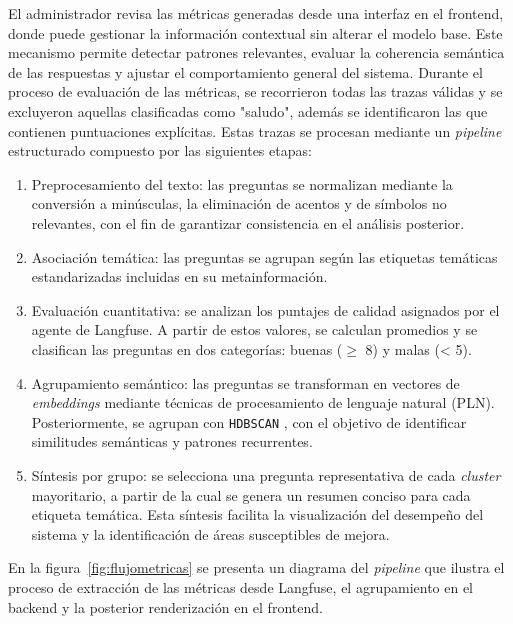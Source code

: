 El administrador revisa las métricas generadas desde una interfaz en el frontend, donde puede gestionar la información contextual sin alterar el modelo base. Este mecanismo permite detectar patrones relevantes, evaluar la coherencia semántica de las respuestas y ajustar el comportamiento general del sistema.
Durante el proceso de evaluación de las métricas, se recorrieron todas las trazas válidas y se excluyeron aquellas clasificadas como "saludo", además se identificaron las que contienen puntuaciones explícitas. Estas trazas se procesan mediante un \textit{pipeline} estructurado compuesto por las siguientes etapas:

\begin{enumerate}
    \item Preprocesamiento del texto: las preguntas se normalizan mediante la conversión a minúsculas, la eliminación de acentos y de símbolos no relevantes, con el fin de garantizar consistencia en el análisis posterior.

    \item Asociación temática: las preguntas se agrupan según las etiquetas temáticas estandarizadas incluidas en su metainformación.

    \item Evaluación cuantitativa: se analizan los puntajes de calidad asignados por el agente de Langfuse. A partir de estos valores, se calculan promedios y se clasifican las preguntas en dos categorías: buenas (\(\geq\) 8) y malas (< 5).

    \item Agrupamiento semántico: las preguntas se transforman en vectores de \emph{embeddings} mediante técnicas de procesamiento de lenguaje natural (PLN). Posteriormente, se agrupan con \texttt{HDBSCAN} \citep{HDBSCAN}, con el objetivo de identificar similitudes semánticas y patrones recurrentes.

    \item Síntesis por grupo: se selecciona una pregunta representativa de cada \textit{cluster} mayoritario, a partir de la cual se genera un resumen conciso para cada etiqueta temática. Esta síntesis facilita la visualización del desempeño del sistema y la identificación de áreas susceptibles de mejora.
\end{enumerate}

En la figura~\ref{fig:flujometricas} se presenta un diagrama del \textit{pipeline} que ilustra el proceso de extracción de las métricas desde Langfuse, el agrupamiento en el backend y la posterior renderización en el frontend.


